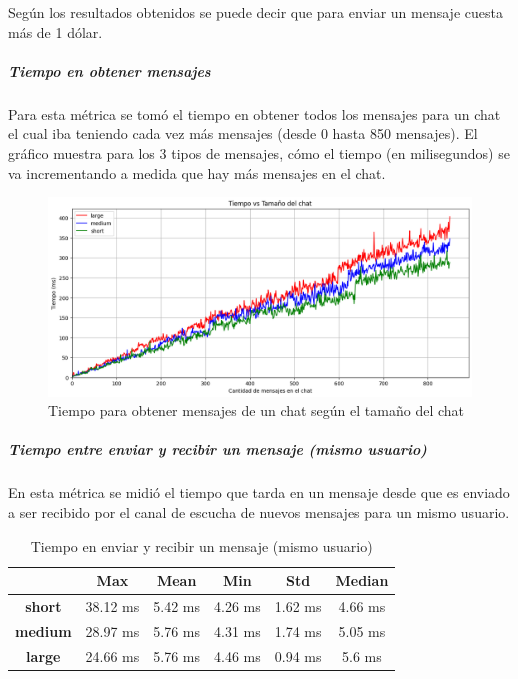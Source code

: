 Según los resultados obtenidos se puede decir que para enviar un mensaje cuesta más de 1 dólar.

\subparagraph{Tiempo en obtener mensajes}

Para esta métrica se tomó el tiempo en obtener todos los mensajes para un chat el cual iba teniendo cada vez más mensajes (desde 0 hasta 850 mensajes). El gráfico muestra para los 3 tipos de mensajes, cómo el tiempo (en milisegundos) se va incrementando a medida que hay más mensajes en el chat.

\begin{figure}[H]
    \centering
    \includegraphics[width=1\linewidth]{img/blockchain-get-message-graphic.png}
    \caption{Tiempo para obtener mensajes de un chat según el tamaño del chat}
    \label{fig:blockchain-get-message-graphic.png}
\end{figure}

\subparagraph{Tiempo entre enviar y recibir un mensaje (mismo usuario)}

En esta métrica se midió el tiempo que tarda en un mensaje desde que es enviado a ser recibido por el canal de escucha de nuevos mensajes para un mismo usuario.

\setlength\tabcolsep{10pt}
\begin{table}[H]
    \centering
    \begin{tabular}{|c|c|c|c|c|c|}
    \hline
    & \textbf{Max} & \textbf{Mean} & \textbf{Min} & \textbf{Std} & \textbf{Median} \\
    \hline
    \textbf{short} & 38.12 ms & 5.42 ms & 4.26 ms & 1.62 ms & 4.66 ms \\
    \hline
    \textbf{medium} & 28.97 ms & 5.76 ms & 4.31 ms & 1.74 ms & 5.05 ms \\
    \hline
    \textbf{large} & 24.66 ms & 5.76 ms & 4.46 ms & 0.94 ms & 5.6 ms \\
    \hline
    \end{tabular}
    \caption{Tiempo en enviar y recibir un mensaje (mismo usuario)}
    \label{tab:tiempo-send-recv-same-user}
\end{table}

